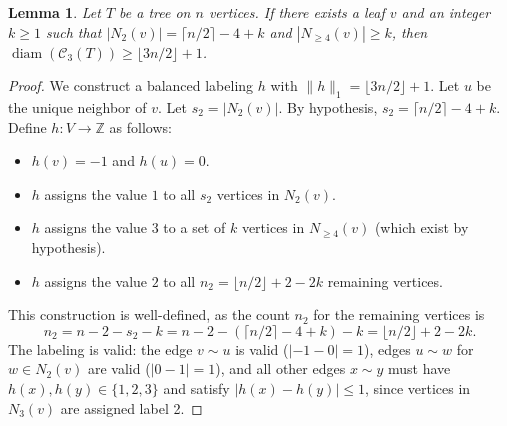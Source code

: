 \documentclass[12pt,reqno]{amsart}
\newtheorem{lem}[thm]{Lemma}
\theoremstyle{definition}
\newcommand{\Z}{\mathbb{Z}}
\newcommand{\diam}{\operatorname{diam}}
\begin{document}
\medskip 

\begin{lem}\label{lem:large-2-neighborhood}
Let $T$ be a tree on $n$ vertices. If there exists a leaf $v$ and an integer $k \ge 1$ such that $|N_2(v)| = \lceil n/2 \rceil - 4 + k$ and $|N_{\ge 4}(v)| \ge k$, then $\diam(\mathcal C_3(T)) \ge \lfloor 3n/2\rfloor + 1$.
\end{lem}

\begin{proof}
We construct a balanced labeling $h$ with $\|h\|_1 = \lfloor 3n/2\rfloor + 1$. Let $u$ be the unique neighbor of $v$. Let $s_2 = |N_2(v)|$. By hypothesis, $s_2 = \lceil n/2 \rceil - 4 + k$. Define $h\colon V \to \Z$ as follows:
\begin{itemize}
    \item $h(v) = -1$ and $h(u) = 0$.
    \item $h$ assigns the value $1$ to all $s_2$ vertices in $N_2(v)$.
    \item $h$ assigns the value $3$ to a set of $k$ vertices in $N_{\ge 4}(v)$ (which exist by hypothesis).
    \item $h$ assigns the value $2$ to all $n_2=\lfloor n/2 \rfloor + 2 - 2k$ remaining vertices.
\end{itemize}
This construction is well-defined, as the count $n_2$ for the remaining vertices is
\[ n_2 = n - 2 - s_2 - k = n - 2 - (\lceil n/2 \rceil - 4 + k) - k = \lfloor n/2 \rfloor + 2 - 2k. \]
The labeling is valid: the edge $v \sim u$ is valid ($|-1-0|=1$), edges $u \sim w$ for $w \in N_2(v)$ are valid ($|0-1|=1$), and all other edges $x \sim y$ must have $h(x), h(y) \in \{1, 2, 3\}$ and satisfy $|h(x)-h(y)| \le 1$, since vertices in $N_3(v)$ are assigned label 2.


\end{proof}
\end{document}
